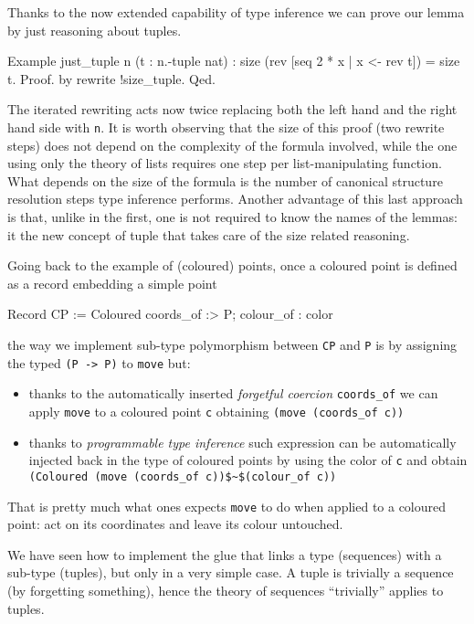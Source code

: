 Thanks to the now extended capability of type inference
we can prove our lemma by just reasoning about tuples.

\begin{coq}{}
Example just_tuple n (t : n.-tuple nat) :
  size (rev [seq 2 * x | x <- rev t]) = size t.
Proof. by rewrite !size_tuple. Qed.
\end{coq}

The iterated rewriting acts now twice replacing both the left hand
and the right hand side with \lstinline/n/.  It is worth observing
that the size of this proof (two rewrite steps) does not depend on the
complexity of the formula involved, while the one using only the
theory of lists requires one step per list-manipulating function.
What depends on the size of the formula is the number of canonical
structure resolution steps type inference performs.  Another advantage
of this last approach is that, unlike in the first, one
is not required to know the names of the lemmas:
it the new concept of tuple that takes care of the size related
reasoning.

Going back to the example of (coloured) points, once a coloured point
is defined as a record embedding a simple point

\begin{coq}{}
Record CP := Coloured { coords_of :> P; colour_of : color }
\end{coq}

\noindent
the way we implement sub-type polymorphism between \lstinline/CP/
and \lstinline/P/ is by assigning the typed \lstinline/(P -> P)/ to
\lstinline/move/ but:
\begin{itemize}
\item thanks to the automatically inserted
	\emph{forgetful coercion} \lstinline/coords_of/
	we can apply \lstinline/move/ to a coloured point \lstinline/c/
	obtaining \lstinline/(move (coords_of c))/
\item thanks to \emph{programmable type inference} such	expression
	can be automatically injected back in the type of coloured
	points by using the color of \lstinline/c/ and obtain
	\lstinline/(Coloured (move (coords_of c))$~$(colour_of c))/
\end{itemize}
That is pretty much what ones expects \lstinline/move/ to do when
applied to a coloured point: act on its coordinates and leave
its colour untouched.

We have seen how to implement the glue that links a type (sequences)
with a sub-type (tuples), but only in a very simple case.
A tuple is trivially a sequence (by forgetting something), hence the
theory of sequences ``trivially'' applies to tuples.

